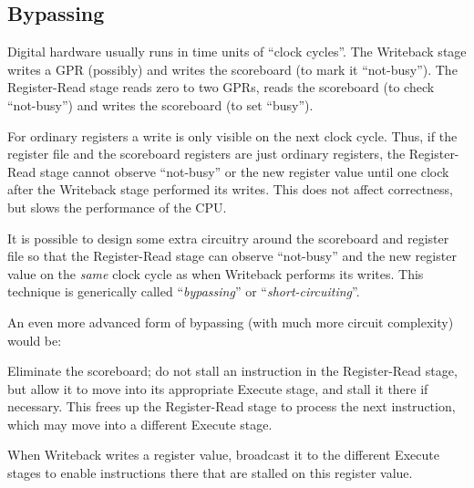 
\subsection{Bypassing}

\label{Sec_Bypassing}


Digital hardware usually runs in time units of ``clock cycles''.  The
Writeback stage writes a GPR (possibly) and writes the scoreboard (to
mark it ``not-busy'').  The Register-Read stage reads zero to two
GPRs, reads the scoreboard (to check ``not-busy'') and writes the
scoreboard (to set ``busy'').

\vspace{1ex}

For ordinary registers a write is only visible on the next clock
cycle.  Thus, if the register file and the scoreboard registers are
just ordinary registers, the Register-Read stage cannot observe
``not-busy'' or the new register value until one clock after the
Writeback stage performed its writes.  This does not affect
correctness, but slows the performance of the CPU.

\vspace{1ex}

It is possible to design some extra circuitry around the scoreboard
and register file so that the Register-Read stage can observe
``not-busy'' and the new register value on the \emph{same} clock cycle
as when Writeback performs its writes.  This technique is generically
called ``\emph{bypassing}'' or ``\emph{short-circuiting}''.




An even more advanced form of bypassing (with much more circuit
complexity) would be:

\begin{tightlist}

 \item Eliminate the scoreboard; do not stall an instruction in the
     Register-Read stage, but allow it to move into its appropriate
     Execute stage, and stall it there if necessary.  This frees up
     the Register-Read stage to process the next instruction, which
     may move into a different Execute stage.

 \item When Writeback writes a register value, broadcast it to the
     different Execute stages to enable instructions there that are
     stalled on this register value.

\end{tightlist}

